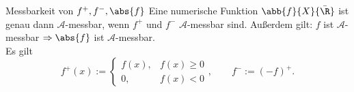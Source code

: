 \begin{karte}{Messbarkeit von \(f^+, f^-, \abs{f}\)}
	Eine numerische Funktion \( \abb{f}{X}{\bar{\R}} \) 
	ist genau dann \( \mathcal{A} \)-messbar, wenn
	\( f^+ \) und \( f^- \) \( \mathcal{A} \)-messbar sind. 
	Außerdem gilt: \( f \) ist \(\mathcal{A}\)-messbar \( \Rightarrow \abs{f} \) ist \( \mathcal{A} \)-messbar.\\
	Es gilt 
	\[ f^+(x) := \begin{cases}
		f(x), & f(x) \geq 0 \\
		0, & f(x) < 0
	\end{cases}, \qquad f^- := (-f)^+. \]
\end{karte}